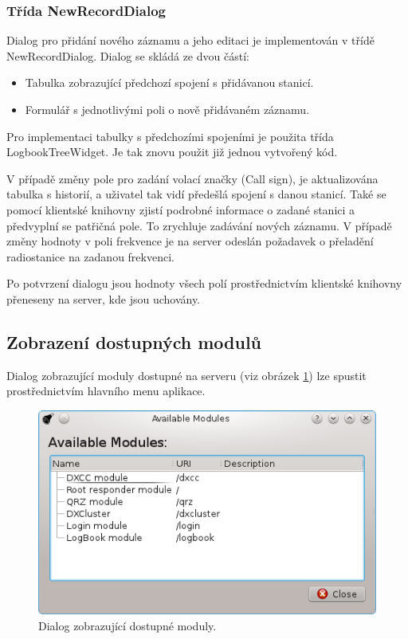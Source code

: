 \subsubsection{Třída NewRecordDialog}

Dialog pro přidání nového záznamu a jeho editaci je implementován v třídě NewRecordDialog. Dialog se skládá ze dvou částí:

\begin{itemize}
\item Tabulka zobrazující předchozí spojení s přidávanou stanicí.
\item Formulář s jednotlivými poli o nově přidávaném záznamu.
\end{itemize}

Pro implementaci tabulky s předchozími spojeními je použita třída
LogbookTreeWidget. Je tak znovu použit již jednou vytvořený
kód.

V případě změny pole pro zadání volací značky (Call sign), je aktualizována tabulka s historií, a uživatel tak vidí předešlá 
spojení s danou stanicí. Také se pomocí klientské knihovny zjistí podrobné informace o zadané stanici a předvyplní se patřičná
pole. To zrychluje zadávání nových záznamu. V případě změny hodnoty v poli frekvence je na server odeslán požadavek o přeladění
radiostanice na zadanou frekvenci.

Po potvrzení dialogu jsou hodnoty všech polí prostřednictvím klientské knihovny přeneseny na server, kde jsou uchovány.

\subsection{Zobrazení dostupných modulů}

Dialog zobrazující moduly dostupné na serveru (viz obrázek \ref{fig:moduly_dialog}) lze spustit prostřednictvím hlavního menu aplikace.

\begin{figure}[h]
\centering
\includegraphics[trim=0cm 0cm 0cm 0cm, scale=1]{fig/ham6}
\caption{Dialog zobrazující dostupné moduly.}
\label{fig:moduly_dialog}
\end{figure}

